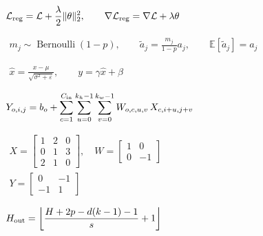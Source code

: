 \documentclass[border=4pt,multi=preview]{standalone}
\begin{document}
\begin{preview}\color{ink}\fontsize{24}{30}\selectfont
$\displaystyle \begin{gathered}\mathcal L_{\rm reg}=\mathcal L+\frac\lambda2\|\theta\|_2^2,\qquad\nabla\mathcal L_{\rm reg}=\nabla\mathcal L+\lambda\theta\end{gathered}$
\end{preview}
\begin{preview}\color{ink}\fontsize{24}{30}\selectfont
$\displaystyle \begin{gathered}m_j\sim\operatorname{Bernoulli}(1-p),\qquad\tilde a_j=\frac{m_j}{1-p}a_j,\qquad\mathbb E[\tilde a_j]=a_j\end{gathered}$
\end{preview}
\begin{preview}\color{ink}\fontsize{24}{30}\selectfont
$\displaystyle \begin{gathered}\hat x=\frac{x-\mu}{\sqrt{\sigma^2+\varepsilon}},\qquad y=\gamma\hat x+\beta\end{gathered}$
\end{preview}
\begin{preview}\color{ink}\fontsize{24}{30}\selectfont
$\displaystyle \begin{gathered}Y_{o,i,j}=b_o+\sum_{c=1}^{C_{\rm in}}\sum_{u=0}^{k_h-1}\sum_{v=0}^{k_w-1}W_{o,c,u,v}\,X_{c,i+u,j+v}\end{gathered}$
\end{preview}
\begin{preview}\color{ink}\fontsize{24}{30}\selectfont
$\displaystyle \begin{gathered}X=\begin{bmatrix}1&2&0\\0&1&3\\2&1&0\end{bmatrix},\quad W=\begin{bmatrix}1&0\\0&-1\end{bmatrix}\\Y=\begin{bmatrix}0&-1\\-1&1\end{bmatrix}\end{gathered}$
\end{preview}
\begin{preview}\color{ink}\fontsize{24}{30}\selectfont
$\displaystyle \begin{gathered}H_{\rm out}=\left\lfloor\frac{H+2p-d(k-1)-1}{s}+1\right\rfloor\end{gathered}$
\end{preview}
\end{document}

